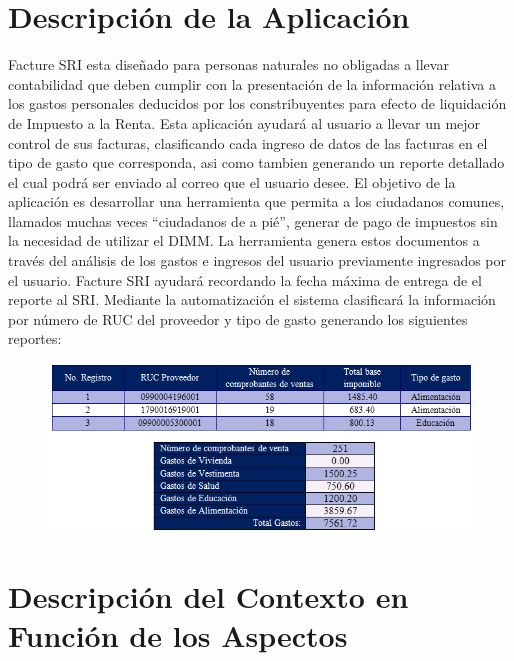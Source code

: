 \documentclass[a4paper,11pt]{article}
\begin{document}
\section{ Descripción de la Aplicación}
Facture SRI esta diseñado para  personas naturales no obligadas a llevar contabilidad que deben cumplir con la presentación de la información relativa a los gastos personales deducidos por los constribuyentes para efecto de liquidación de Impuesto a la Renta.
Esta aplicación ayudará al usuario a llevar un mejor control de sus facturas, clasificando cada ingreso de datos de las facturas en el tipo de gasto que corresponda, asi como tambien generando un reporte detallado el cual podrá ser enviado al correo que el usuario desee. 
El objetivo de la aplicación  es desarrollar una herramienta que permita a los ciudadanos comunes, llamados muchas veces  “ciudadanos de a pié”, generar de pago de impuestos sin la necesidad de utilizar el DIMM. La herramienta genera estos documentos a través del análisis de los gastos e ingresos del usuario previamente ingresados por el usuario.
Facture SRI  ayudará  recordando la fecha máxima de entrega de el reporte al SRI. 
Mediante la automatización el sistema clasificará la información por número de RUC del proveedor y tipo de gasto generando los siguientes reportes: 

\begin{figure} [h]
\begin {center}
\includegraphics[width=1\textwidth]{img.png}
\end {center}
\end{figure}


\section{ Descripción del Contexto en Función de los Aspectos}
\end{document}
